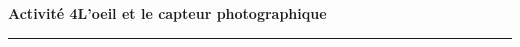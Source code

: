 \documentclass[a4paper]{article}
\begin{document}
%
%
%
%
%
%
%
%
%
%


\noindent\textbf{Activité 4}\hfill{}\textbf{L'oeil et le capteur photographique}
\smallskip
\hrule
\medskip
\end{document}
